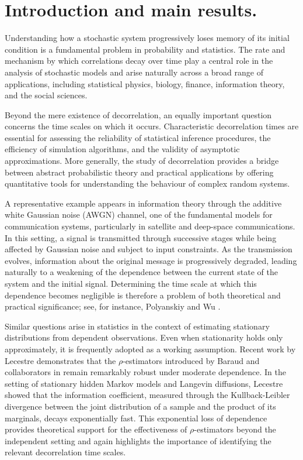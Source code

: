 \documentclass[12pt,thmsa]{article}
\begin{document}
\section{Introduction and main results.} 
Understanding how a stochastic system progressively loses  memory of its initial condition is a fundamental problem in probability and statistics. The rate and mechanism by which correlations decay over time play a central role in the analysis of stochastic models and arise naturally across a broad range of applications, including statistical physics, biology, finance, information theory, and the social sciences.

Beyond the mere existence of decorrelation, an equally important question concerns the time scales on which it occurs. Characteristic decorrelation times are essential for assessing the reliability of statistical inference procedures, the efficiency of simulation algorithms, and the validity of asymptotic approximations. More generally, the study of decorrelation provides a bridge between abstract probabilistic theory and practical applications by  offering quantitative tools for understanding the behaviour of complex random systems.

 A representative example appears in information theory through the additive white Gaussian noise (AWGN) channel, one of the fundamental models for communication systems, particularly in satellite and deep-space communications. In this setting, a signal is transmitted through successive stages while being affected by Gaussian noise and subject to input constraints. As the transmission evolves, information about the original message is progressively degraded, leading naturally to a weakening of the dependence between the current state of the system and the initial signal. Determining the time scale at which this dependence becomes negligible is therefore a problem of both theoretical and practical significance; see, for instance, Polyanskiy and Wu \cite{PolWu}.

Similar questions arise in statistics in the context of estimating stationary distributions from dependent observations. Even when stationarity holds only approximately, it is frequently adopted as a working assumption. Recent work by Lecestre \cite{Lec} demonstrates that the $\rho$-estimators introduced by  Baraud and collaborators in \cite{BBS,BB} remain remarkably robust under moderate dependence. In the setting of stationary hidden Markov models and Langevin diffusions, Lecestre showed that the information coefficient, measured through the Kullback-Leibler divergence between the joint distribution of a sample and the product of its marginals, decays exponentially fast. This exponential loss of dependence provides theoretical support for the effectiveness of $\rho$-estimators beyond the independent setting and again highlights the importance of identifying the relevant decorrelation time scales.
\end{document}
